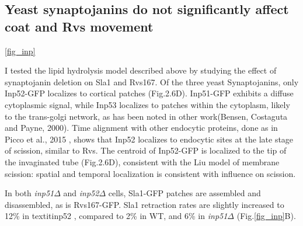 	\subsection{Yeast synaptojanins do not significantly affect coat and Rvs movement } 
\ref{fig_inp}
	

I tested the lipid hydrolysis model described above by studying the effect of synaptojanin deletion on Sla1 and Rvs167. 
Of the three yeast Synaptojanins, only Inp52-GFP localizes to cortical patches (Fig.2.6D). Inp51-GFP exhibits a diffuse cytoplasmic signal, while Inp53 localizes to patches within the cytoplasm, likely to the trans-golgi network, as has been noted in other work(Bensen, Costaguta and Payne, 2000). Time alignment with other endocytic proteins, done as in Picco et al., 2015 , shows that Inp52 localizes to endocytic sites at the late stage of scission, similar to Rvs. The centroid of Inp52-GFP is localized to the tip of the invaginated tube (Fig.2.6D), consistent with the Liu model of membrane scission: spatial and temporal localization is consistent with influence on scission. 

	\vspace{5mm}
	
In both \textit{inp51$\Delta$} and \textit{inp52$\Delta$} cells, Sla1-GFP patches are assembled and disassembled, as is Rvs167-GFP. Sla1 retraction rates are slightly increased to 12\% in textit{inp52\textDelta}  , compared to 2\% in WT, and 6\% in \textit{inp51$\Delta$}
 (Fig.\ref{fig_inp}B). 
\vspace{5mm}
		
